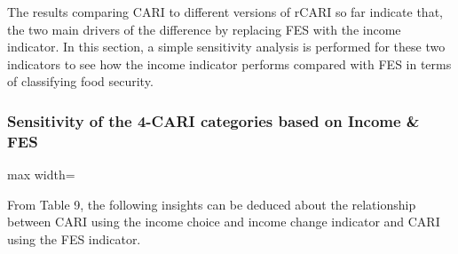 \documentclass[11pt,harvard]{article}
\begin{document}
	The results comparing CARI to different versions of rCARI so far indicate that, the two main drivers of the difference by replacing FES with the income indicator. In this section, a simple sensitivity analysis is performed for these two indicators to see how the income indicator performs compared with FES in terms of classifying food security.
	
	\subsubsection{Sensitivity of the 4-CARI categories based on Income \& FES}
	\begin{table}[htbp]
		\centering
		\begin{adjustbox}{max width=\textwidth}
			\begin{threeparttable}
				\caption{Cross Tabulation of CARI\_FES vs. CARI\_Income}
				\scriptsize
				 
				\label{tab:BF_FS_Cat_Cross_Tabulation}
			\end{threeparttable}
		\end{adjustbox}
	\end{table}
	
	From Table 9, the following insights can be deduced about the relationship between CARI using the income choice and income change indicator and CARI using the FES indicator.
	
\end{document}
